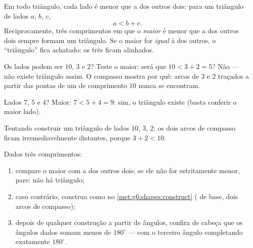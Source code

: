 \begin{theorem}\label{thm:g7:triangles:inequality}
Em todo triângulo, cada lado é menor que a  dos outros dois: para
um triângulo de lados $a$, $b$, $c$,
\[
a < b + c .
\]
Reciprocamente, três comprimentos em que o \emph{maior} é menor que a
 dos outros dois sempre formam um triângulo. Se o maior for
\emph{igual} à  dos outros, o ``triângulo'' fica achatado: os três
 ficam alinhados.
\end{theorem}
\admitted

\begin{example}\label{ex:g7:triangles:inequality}
Os lados podem ser $10$, $3$ e $2$? Teste o maior: será que
$10 < 3 + 2 = 5$? Não --- não existe triângulo assim. O compasso mostra
por quê: arcos de  $3$ e $2$ traçados a partir das pontas de um
 de comprimento $10$ nunca se encontram.

Lados $7$, $5$ e $4$? Maior: $7 < 5 + 4 = 9$: sim, o triângulo existe
(basta conferir o maior lado).
\end{example}

\begin{omfigure}

{\small Tentando construir um triângulo de lados $10$, $3$, $2$: os
dois arcos de compasso ficam irremediavelmente distantes, porque
$3 + 2 < 10$.}
\end{omfigure}

\begin{method}\label{met:g7:triangles:construct}
Dados três comprimentos:
\begin{enumerate}
  \item compare o maior com a  dos outros dois; se ele não for
        estritamente menor, pare: não há triângulo;
  \item caso contrário, construa como no
        \cref{met:g6:shapes:construct} ( de base, dois arcos de
        compasso);
  \item depois de qualquer construção a partir de ângulos, confira de
        cabeça que os ângulos dados somam menos de $180^\circ$ --- com
        o terceiro ângulo completando exatamente $180^\circ$.
\end{enumerate}
\end{method}

